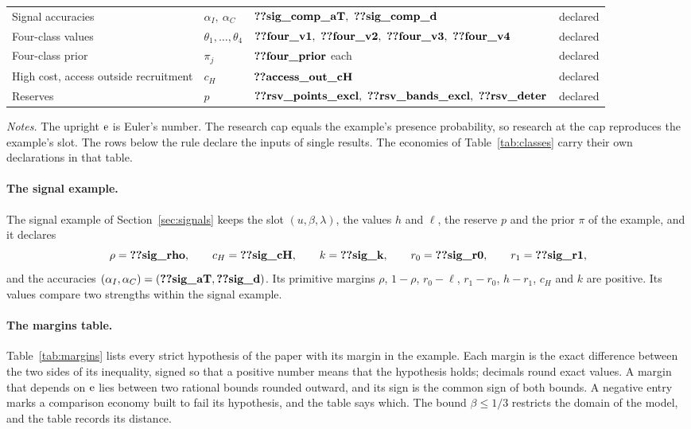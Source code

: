 \begin{table}[ht]
\begin{tabular}{@{}llll@{}}
Signal accuracies & \(\alpha_I,\ \alpha_C\) & \(\reg{sig_comp_aT},\ \reg{sig_comp_d}\) & declared\\
Four-class values & \(\theta_1,\dots,\theta_4\) & \(\reg{four_v1},\ \reg{four_v2},\ \reg{four_v3},\ \reg{four_v4}\) & declared\\
Four-class prior & \(\pi_j\) & \(\reg{four_prior}\) each & declared\\
High cost, access outside recruitment & \(c_H\) & \(\reg{access_out_cH}\) & declared\\
Reserves & \(p\) & \(\reg{rsv_points_excl},\ \reg{rsv_bands_excl},\ \reg{rsv_deter}\) & declared\\
\bottomrule
\end{tabular}
\par\medskip
\begin{minipage}{0.92\linewidth}\footnotesize
\textit{Notes.} The upright \(\mathrm{e}\) is Euler's number. The research cap equals the example's presence probability, so
research at the cap reproduces the example's slot. The rows below the rule declare the inputs of single results. The
economies of Table~\ref{tab:classes} carry their own declarations in that table.
\end{minipage}
\end{table}

\paragraph{The signal example.}
The signal example of Section~\ref{sec:signals} keeps the slot \((u,\beta,\lambda)\), the values \(h\) and \(\ell\),
the reserve \(p\) and the prior \(\pi\) of the example, and it declares
\[
\rho=\reg{sig_rho},\qquad c_H=\reg{sig_cH},\qquad k=\reg{sig_k},\qquad r_0=\reg{sig_r0},\qquad r_1=\reg{sig_r1},
\]
and the accuracies \((\alpha_I,\alpha_C)=(\reg{sig_aT},\reg{sig_d})\). Its primitive margins \(\rho\), \(1-\rho\),
\(r_0-\ell\), \(r_1-r_0\), \(h-r_1\), \(c_H\) and \(k\) are positive. Its values compare two strengths within the
signal example.

\paragraph{The margins table.}
Table~\ref{tab:margins} lists every strict hypothesis of the paper with its margin in the example. Each margin is the
exact difference between the two sides of its inequality, signed so that a positive number means that the hypothesis
holds; decimals round exact values. A margin that depends on \(\mathrm{e}\) lies between two rational bounds rounded
outward, and its sign is the common sign of both bounds. A negative entry marks a comparison economy built to fail
its hypothesis, and the table says which. The bound \(\beta\le1/3\) restricts the domain of the model, and the table
records its distance.

